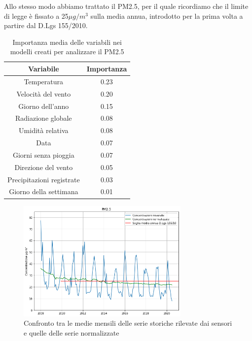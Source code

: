 
Allo stesso modo abbiamo trattato il PM2.5, per il quale ricordiamo che il limite di legge è fissato a 25$\mu g/m^3$ sulla media annua, introdotto per la prima volta a partire dal D.Lgs 155/2010.

\begin{table}[h!]
\centering
\begin{tabular}{ |c c| }
	\hline
	Variabile & Importanza \\
	\hline
	Temperatura & 0.23 \\
	Velocità del vento & 0.20 \\
	Giorno dell'anno & 0.15 \\
	Radiazione globale & 0.08 \\
	Umidità relativa & 0.08 \\
	Data & 0.07 \\
	Giorni senza pioggia & 0.07 \\
	Direzione del vento & 0.05 \\
	Precipitazioni registrate & 0.03 \\
	Giorno della settimana & 0.01 \\
	\hline
\end{tabular}
\caption{Importanza media delle variabili nei modelli creati per analizzare il PM2.5}
\label{table:importanza_pm25}
\end{table}

\begin{figure}[h]
\centering
\includegraphics[width=0.75\textwidth]{pm25_medie_mensili}
\caption{Confronto tra le medie mensili delle serie storiche rilevate dai sensori e quelle delle serie normalizzate}
\label{fig:pm25_medie_mensili}
\end{figure}

